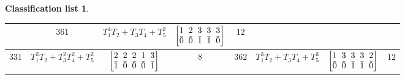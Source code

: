 \documentclass[10pt,a4paper]{amsart}
\theoremstyle{definition}
\newtheorem{class-list}[thm]{Classification list}
\numberwithin{equation}{section}
\begin{document}
\begin{class-list}
\begin{table}[h!]
\begin{tabu}{c|c|c|c||c|c|c|c}
&${361}$&${T_{1}^{4}T_{2}+T_{3}T_{4}+T_{5}^{2}}$
&$\arraycolsep=1mm\begin{bmatrix}{1} & {2} & {3} & {3} & {3} \\ {\bar{0}} & {\bar{0}} & {\bar{1}} & {\bar{1}} & {\bar{0}}\end{bmatrix}$&${12}$
\\
\hline
${331}$&${T_{1}^{2}T_{2}+T_{3}^{2}T_{4}^{2}+T_{5}^{2}}$
&$\arraycolsep=1mm\begin{bmatrix}{2} & {2} & {2} & {1} & {3} \\ {\bar{1}} & {\bar{0}} & {\bar{0}} & {\bar{0}} & {\bar{1}}\end{bmatrix}$&${8}$
&${362}$&${T_{1}^{3}T_{2}+T_{3}T_{4}+T_{5}^{3}}$
&$\arraycolsep=1mm\begin{bmatrix}{1} & {3} & {3} & {3} & {2} \\ {\bar{0}} & {\bar{0}} & {\bar{1}} & {\bar{1}} & {\bar{0}}\end{bmatrix}$&${12}$
\\
\hline
\end{tabu}\vspace{6mm}
\end{table}



\end{class-list}
\end{document}
